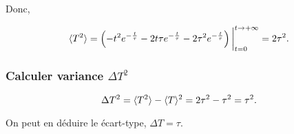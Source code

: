 \documentclass[french]{article}
\begin{document}
{\begin{tcolorbox}[colback=yellow!5!white,colframe=yellow!75!black]
		\end{tcolorbox}
	
		Donc,
		
		\begin{dmath}
			\langle T^2 \rangle = \left( -t^2e^{-\frac{t}{\tau}} - 2t\tau e^{-\frac{t}{\tau}} -2\tau^2e^{-\frac{t}{\tau}} \right)\bigg\rvert_{t=0}^{t \to +\infty}\\
			= 2\tau^2.
		\end{dmath}
	
		\subsubsection*{Calculer variance $\Delta T ^2$}
		
		\begin{dmath}
			\Delta T^2  = \langle T^2 \rangle - \langle T \rangle ^2 \\
			= 2\tau^2 - \tau^2 \\
			= \tau^2.
		\end{dmath}
	
		On peut en déduire le écart-type, $\Delta T = \tau$.
	}

	\newpage
\end{document}

